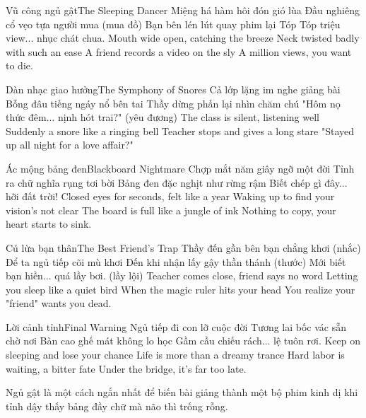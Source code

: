 \begin{tutuyetbox}{Vũ công ngủ gật}{The Sleeping Dancer}
Miệng há hàm hôi đón gió lùa
Đầu nghiêng cổ vẹo tựa người mua (mua đồ)
Bạn bên lén lút quay phim lại
Tóp Tóp triệu view... nhục chát chua.
\tcblower
Mouth wide open, catching the breeze
Neck twisted badly with such an ease
A friend records a video on the sly
A million views, you want to die.
\end{tutuyetbox}

\begin{tutuyetbox}{Dàn nhạc giao hưởng}{The Symphony of Snores}
Cả lớp lặng im nghe giảng bài
Bỗng đâu tiếng ngáy nổ bên tai
Thầy dừng phấn lại nhìn chăm chú
"Hôm nọ thức đêm... nịnh hót trai?" (yêu đương)
\tcblower
The class is silent, listening well
Suddenly a snore like a ringing bell
Teacher stops and gives a long stare
"Stayed up all night for a love affair?"
\end{tutuyetbox}

\begin{tutuyetbox}{Ác mộng bảng đen}{Blackboard Nightmare}
Chợp mắt năm giây ngỡ một đời
Tỉnh ra chữ nghĩa rụng tơi bời
Bảng đen đặc nghịt như rừng rậm
Biết chép gì đây... hỡi đất trời!
\tcblower
Closed eyes for seconds, felt like a year
Waking up to find your vision's not clear
The board is full like a jungle of ink
Nothing to copy, your heart starts to sink.
\end{tutuyetbox}

\begin{tutuyetbox}{Cú lừa bạn thân}{The Best Friend's Trap}
Thầy đến gần bên bạn chẳng khơi (nhắc)
Để ta ngủ tiếp cõi mù khơi
Đến khi nhận lấy gậy thần thánh (thước)
Mới biết bạn hiền... quá lầy bơi. (lầy lội)
\tcblower
Teacher comes close, friend says no word
Letting you sleep like a quiet bird
When the magic ruler hits your head
You realize your "friend" wants you dead.
\end{tutuyetbox}

\begin{tutuyetbox}{Lời cảnh tỉnh}{Final Warning}
Ngủ tiếp đi con lỡ cuộc đời
Tương lai bốc vác sẵn chờ nơi
Bàn cao ghế mát không lo học
Gầm cầu chiếu rách... lệ tuôn rơi.
\tcblower
Keep on sleeping and lose your chance
Life is more than a dreamy trance
Hard labor is waiting, a bitter fate
Under the bridge, it's far too late.
\end{tutuyetbox}

\begin{ghichu}
Ngủ gật là một cách ngắn nhất để biến bài giảng thành một bộ phim kinh dị khi tỉnh dậy thấy bảng đầy chữ mà não thì trống rỗng.
\end{ghichu}